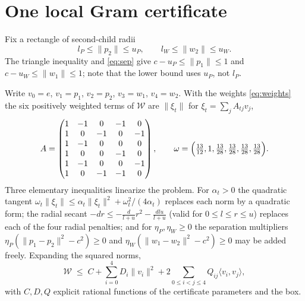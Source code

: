 \documentclass[11pt]{article}
\newcommand{\score}{\mathcal{W}}
\newcommand{\ip}[2]{\langle #1,#2\rangle}
\newcommand{\norm}[1]{\lVert #1\rVert}
\begin{document}
\section{One local Gram certificate}

Fix a rectangle of second-child radii
\begin{equation}
l_P\le\norm{p_2}\le u_P,\qquad l_W\le\norm{w_2}\le u_W .
\label{eq:box}
\end{equation}
The triangle inequality and \eqref{eq:sep} give $c-u_P\le\norm{p_1}\le1$ and
$c-u_W\le\norm{w_1}\le1$; note that the lower bound uses $u_P$, not $l_P$.

Write $v_0=e$, $v_1=p_1$, $v_2=p_2$, $v_3=w_1$, $v_4=w_2$. With the weights \eqref{eq:weights}
the six positively weighted terms of $\score$ are $\norm{\xi_t}$ for $\xi_t=\sum_j A_{tj}v_j$,
\[
A=\begin{pmatrix}
1&-1&0&-1&0\\ 1&0&-1&0&-1\\ 1&-1&0&0&0\\
1&0&0&-1&0\\ 1&-1&0&0&-1\\ 1&0&-1&-1&0
\end{pmatrix},
\qquad
\omega=\Bigl(\tfrac{13}{12},1,\tfrac{13}{28},\tfrac{13}{28},\tfrac{13}{28},\tfrac{13}{28}\Bigr).
\]
Three elementary inequalities linearize the problem. For $\alpha_t>0$ the quadratic tangent
$\omega_t\norm{\xi_t}\le\alpha_t\norm{\xi_t}^2+\omega_t^2/(4\alpha_t)$ replaces each norm by a
quadratic form; the radial secant $-dr\le-\frac d{l+u}r^2-\frac{dlu}{l+u}$ (valid for
$0\le l\le r\le u$) replaces each of the four radial penalties; and for
$\eta_P,\eta_W\ge0$ the separation multipliers $\eta_P(\norm{p_1-p_2}^2-c^2)\ge0$ and
$\eta_W(\norm{w_1-w_2}^2-c^2)\ge0$ may be added freely. Expanding the squared norms,
\begin{equation}
\score\;\le\;C+\sum_{i=0}^4 D_i\norm{v_i}^2+2\!\!\sum_{0\le i<j\le4}\!\!Q_{ij}\ip{v_i}{v_j},
\label{eq:quad}
\end{equation}
with $C,D,Q$ explicit rational functions of the certificate parameters and the box.
\end{document}
